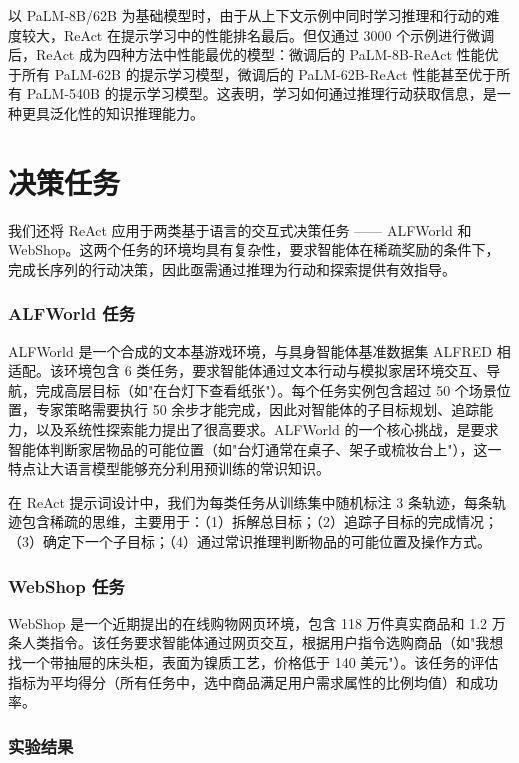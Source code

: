 以 PaLM-8B/62B 为基础模型时，由于从上下文示例中同时学习推理和行动的难度较大，ReAct 在提示学习中的性能排名最后。但仅通过 3000 个示例进行微调后，ReAct 成为四种方法中性能最优的模型：微调后的 PaLM-8B-ReAct 性能优于所有 PaLM-62B 的提示学习模型，微调后的 PaLM-62B-ReAct 性能甚至优于所有 PaLM-540B 的提示学习模型。这表明，学习如何通过推理行动获取信息，是一种更具泛化性的知识推理能力。

\section{决策任务}

我们还将 ReAct 应用于两类基于语言的交互式决策任务 —— ALFWorld 和 WebShop。这两个任务的环境均具有复杂性，要求智能体在稀疏奖励的条件下，完成长序列的行动决策，因此亟需通过推理为行动和探索提供有效指导。

\subsubsection*{ALFWorld 任务}

ALFWorld 是一个合成的文本基游戏环境，与具身智能体基准数据集 ALFRED 相适配。该环境包含 6 类任务，要求智能体通过文本行动与模拟家居环境交互、导航，完成高层目标（如"在台灯下查看纸张"）。每个任务实例包含超过 50 个场景位置，专家策略需要执行 50 余步才能完成，因此对智能体的子目标规划、追踪能力，以及系统性探索能力提出了很高要求。ALFWorld 的一个核心挑战，是要求智能体判断家居物品的可能位置（如"台灯通常在桌子、架子或梳妆台上"），这一特点让大语言模型能够充分利用预训练的常识知识。

在 ReAct 提示词设计中，我们为每类任务从训练集中随机标注 3 条轨迹，每条轨迹包含稀疏的思维，主要用于：（1）拆解总目标；（2）追踪子目标的完成情况；（3）确定下一个子目标；（4）通过常识推理判断物品的可能位置及操作方式。

\subsubsection*{WebShop 任务}

WebShop 是一个近期提出的在线购物网页环境，包含 118 万件真实商品和 1.2 万条人类指令。该任务要求智能体通过网页交互，根据用户指令选购商品（如"我想找一个带抽屉的床头柜，表面为镍质工艺，价格低于 140 美元"）。该任务的评估指标为平均得分（所有任务中，选中商品满足用户需求属性的比例均值）和成功率。

\subsubsection*{实验结果}

